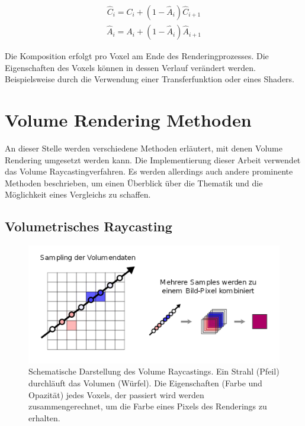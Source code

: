\begin{align}
\hat{C}_{i}=C_{i}+(1-\hat{A}_{i})\hat{C}_{i+1}
\end{align}
\begin{align}
\hat{A}_{i}=A_{i}+(1-\hat{A}_{i})\hat{A}_{i+1}
\end{align}

Die Komposition erfolgt pro Voxel am Ende des Renderingprozesses. Die Eigenschaften des Voxels können in dessen Verlauf verändert werden. Beispielsweise durch die Verwendung einer Transferfunktion oder eines Shaders.


\section{Volume Rendering Methoden}

An dieser Stelle werden verschiedene Methoden erläutert, mit denen Volume Rendering umgesetzt werden kann. Die Implementierung dieser Arbeit verwendet das Volume Raycastingverfahren. Es werden allerdings auch andere prominente Methoden beschrieben, um einen Überblick über die Thematik und die Möglichkeit eines Vergleichs zu schaffen.

\subsection{Volumetrisches Raycasting}
\label{rayCasting}


\begin{figure}[!htb]
	\centering
	\includegraphics[width=0.7\linewidth]{images/rayCasting.png}
	\caption{Schematische Darstellung des Volume Raycastings. Ein Strahl (Pfeil) durchläuft das Volumen (Würfel). Die Eigenschaften (Farbe und Opazität) jedes Voxels, der passiert wird werden zusammengerechnet, um die Farbe eines Pixels des Renderings zu erhalten.}
	\label{img:rayCasting}
\end{figure}
\FloatBarrier

